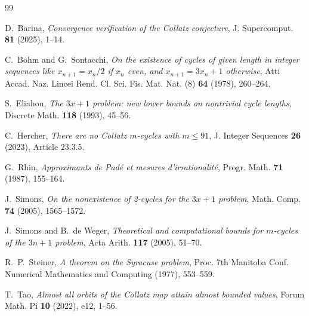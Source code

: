 \documentclass[11pt, a4paper]{amsart}
\theoremstyle{definition}
\begin{document}
\begin{thebibliography}{99}

D.~Barina, \emph{Convergence verification of the Collatz conjecture}, J. Supercomput. \textbf{81} (2025), 1--14.

C.~Bohm and G.~Sontacchi, \emph{On the existence of cycles of given length in integer sequences like $x_{n+1} = x_n/2$ if $x_n$ even, and $x_{n+1} = 3x_n + 1$ otherwise}, Atti Accad. Naz. Lincei Rend. Cl. Sci. Fis. Mat. Nat. (8) \textbf{64} (1978), 260--264.

S.~Eliahou, \emph{The $3x+1$ problem: new lower bounds on nontrivial cycle lengths}, Discrete Math. \textbf{118} (1993), 45--56.

C.~Hercher, \emph{There are no Collatz $m$-cycles with $m \le 91$}, J. Integer Sequences \textbf{26} (2023), Article 23.3.5.

G.~Rhin, \emph{Approximants de Pad\'{e} et mesures d'irrationalit\'{e}}, Progr. Math. \textbf{71} (1987), 155--164.

J.~Simons, \emph{On the nonexistence of 2-cycles for the $3x+1$ problem}, Math. Comp. \textbf{74} (2005), 1565--1572.

J.~Simons and B.~de Weger, \emph{Theoretical and computational bounds for $m$-cycles of the $3n+1$ problem}, Acta Arith. \textbf{117} (2005), 51--70.

R.~P.~Steiner, \emph{A theorem on the Syracuse problem}, Proc. 7th Manitoba Conf. Numerical Mathematics and Computing (1977), 553--559.

T.~Tao, \emph{Almost all orbits of the Collatz map attain almost bounded values}, Forum Math. Pi \textbf{10} (2022), e12, 1--56.

\end{thebibliography}
\end{document}
